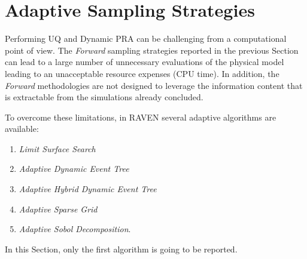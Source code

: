 \newcommand{\mathlarger}[1]{#1}

\section{Adaptive Sampling Strategies}
Performing UQ and Dynamic PRA can be
challenging from a computational point of view. The \textit{Forward}
sampling strategies reported in the previous Section can lead to a large number of
unnecessary evaluations of the physical model leading to an unacceptable resource expenses (CPU time).
In addition, the \textit{Forward} methodologies are not designed to leverage the information
content that is extractable from the simulations already concluded.

To overcome these limitations, in RAVEN several adaptive algorithms are available:
\begin{enumerate}
  \item \textit{Limit Surface Search}
  \item \textit{Adaptive Dynamic Event Tree}
  \item \textit{Adaptive Hybrid Dynamic Event Tree}
  \item \textit{Adaptive Sparse Grid}
  \item \textit{Adaptive Sobol Decomposition}.
\end{enumerate}
In this Section, only the first algorithm is going to be reported.

